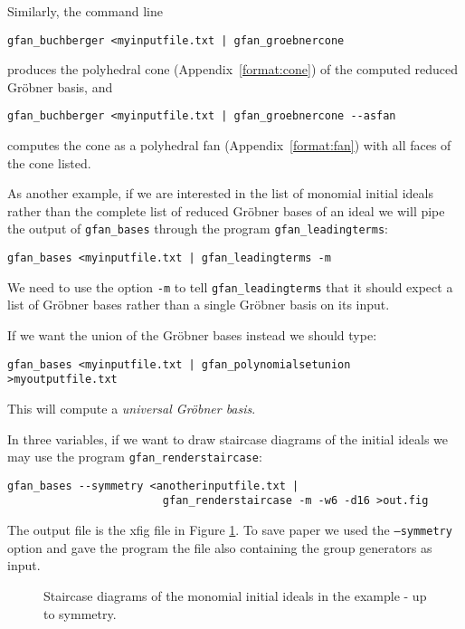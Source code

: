 Similarly, the command line
\begin{verbatim}
gfan_buchberger <myinputfile.txt | gfan_groebnercone
\end{verbatim}
produces the polyhedral cone (Appendix~\ref{format:cone}) of the computed reduced Gr\"obner basis, and
\begin{verbatim}
gfan_buchberger <myinputfile.txt | gfan_groebnercone --asfan
\end{verbatim}
computes the cone as a polyhedral fan (Appendix~\ref{format:fan}) with all faces of the cone listed.

As another example, if we are interested in the list of monomial initial ideals rather than the complete list of reduced Gr\"obner bases of an ideal we will pipe the output of \texttt{gfan\_bases} through the program \texttt{gfan\_leadingterms}:
\begin{verbatim}
gfan_bases <myinputfile.txt | gfan_leadingterms -m
\end{verbatim}
We need to use the option \texttt{-m} to tell \texttt{gfan\_leadingterms} that it should expect a list of Gr\"obner bases rather than a single Gr\"obner basis on its input.

If we want the union of the Gr\"obner bases instead we should type:
\begin{verbatim}
gfan_bases <myinputfile.txt | gfan_polynomialsetunion >myoutputfile.txt
\end{verbatim}
This will compute a \emph{universal Gr\"obner basis}.

In three variables, if we want to draw staircase diagrams of the initial ideals we may use the program \texttt{gfan\_renderstaircase}:
\begin{verbatim}
gfan_bases --symmetry <anotherinputfile.txt | 
                        gfan_renderstaircase -m -w6 -d16 >out.fig
\end{verbatim}
The output file is the xfig file in Figure \ref{fig:staircase}. To save paper we used the \texttt{--symmetry} option and gave the program the file also containing the group generators as input.
\begin{figure}
\begin{center}
\end{center}
\caption{Staircase diagrams of the monomial initial ideals in the example - up to symmetry.}
\label{fig:staircase}
\end{figure}
 


